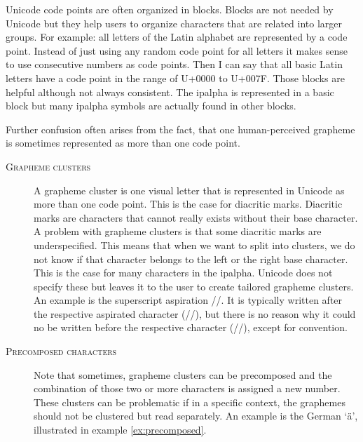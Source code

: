 Unicode code points are often organized in blocks. Blocks are not needed by Unicode but they help users to organize characters that are related into larger groups. For example: all letters of the Latin alphabet are represented by a code point. Instead of just using any random code point for all letters it makes sense to use consecutive numbers as code points. Then I can say that all basic Latin letters have a code point in the range of U+0000 to U+007F. Those blocks are helpful although not always consistent. The \ac{ipalpha} is represented in a basic block but many \ac{ipalpha} symbols are actually found in other blocks. 

Further confusion often arises from the fact, that one human-perceived grapheme is sometimes represented as more than one code point. 

\begin{description}
\item[\textsc{Grapheme clusters}] A grapheme cluster is one visual letter that is represented in Unicode as more than one code point. This is the case for diacritic marks. Diacritic marks are characters that cannot really exists without their base character. A problem with grapheme clusters is that some diacritic marks are underspecified. This means that when we want to split into clusters, we do not know if that character belongs to the left or the right base character. This is the case for many characters in the \ac{ipalpha}. Unicode does not specify these but leaves it to the user to create tailored grapheme clusters. An example is the superscript aspiration //. It is typically written after the respective aspirated character (//), but there is no reason why it could no be written before the respective character (//), except for convention.
\item[\textsc{Precomposed characters}] Note that sometimes, grapheme clusters can be precomposed and the combination of those two or more characters is assigned a new number. These clusters can be problematic if in a specific context, the graphemes should not be clustered but read separately. An example is the German `ä', illustrated in example \ref{ex:precomposed}.


\end{description} 

